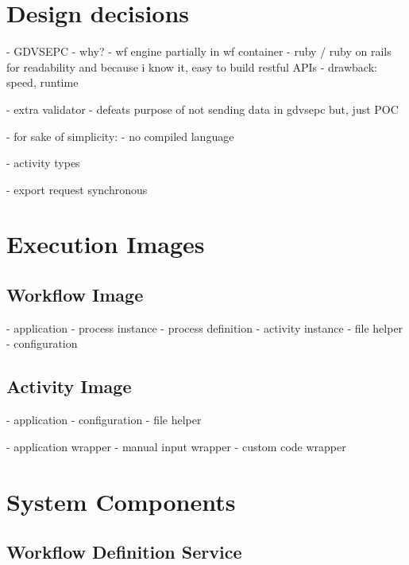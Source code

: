 
\section{Design decisions} %
\label{sec:design_decisions}
  - GDVSEPC
    - why?
  - wf engine partially in wf container
  - ruby / ruby on rails for readability and because i know it, easy to build restful APIs
    - drawback: speed, runtime

  - extra validator
    - defeats purpose of not sending data in gdvsepc but, just POC

  - for sake of simplicity:
    - no compiled language

  - activity types

  - export request synchronous

\section{Execution Images} %
\label{sec:execution_images}

  \subsection{Workflow Image} %
  \label{sub:workflow_container}
    - application
      - process instance
      - process definition
      - activity instance
      - file helper
      - configuration


  \subsection{Activity Image} %
  \label{sub:activity_containers}
    - application
      - configuration
      - file helper

    - application wrapper
    - manual input wrapper
    - custom code wrapper

\section{System Components} %
\label{sec:components_implementation}
  \subsection{Workflow Definition Service} %
    \label{sub:workflow_definition_service}

